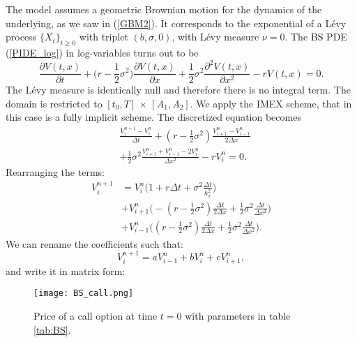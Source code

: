 The \cite{BS73} model assumes a geometric Brownian motion for the dynamics of the underlying, as we saw in (\ref{GBM2}).
It corresponds to the exponential of a Lévy process $\{X_t\}_{t\geq 0}$ with triplet $(b,\sigma,0)$, with Lévy measure $\nu = 0$.
The BS PDE (\ref{PIDE_log}) in log-variables turns out to be
\begin{equation}\label{BS_PDE}
\frac{\partial  V(t,x)}{\partial t}  
          + \biggl( r -\frac{1}{2}\sigma^2 \biggr) \frac{\partial V(t,x)}{\partial x}
          + \frac{1}{2} \sigma^2 \frac{\partial^2  V(t,x)}{\partial x^2} - r  V(t,x)  = 0.
\end{equation}
The Lévy measure is identically null and therefore there is no integral term.
The domain is restricted to $[t_0,T]\, \times \, [A_1,A_2]$. We apply the IMEX scheme, that in this case is a fully implicit scheme.  
The discretized equation becomes
\begin{align}
&\frac{V^{n+1}_{i} -V^{n}_{i}}{\Delta t} + 
(r-\frac{1}{2}\sigma^2) \frac{V^{n}_{i+1} -V^{n}_{i-1}}{ 2 \Delta x} \\ \nonumber
&+ \frac{1}{2} \sigma^2 \frac{V^{n}_{i+1} + V^{n}_{i-1} - 2 V^{n}_{i}}{\Delta x^2}  - r V^{n}_i = 0.
\end{align}
Rearranging the terms: 
\begin{align*}
 V^{n+1}_{i} &= V^{n}_{i} \biggl( 1 + r\Delta t + \sigma^2 \frac{\Delta t}{h_x^2} \biggr)  \\
& + V^{n}_{i+1} \biggl( -(r -\frac{1}{2}\sigma^2)\frac{\Delta t}{2 \Delta x} +
\frac{1}{2}\sigma^2 \frac{\Delta t}{\Delta x^2}  \biggr)  \\
& + V^{n}_{i-1} \biggl( (r -\frac{1}{2}\sigma^2)\frac{\Delta t}{2 \Delta x} + 
\frac{1}{2}\sigma^2 \frac{\Delta t}{\Delta x^2}  \biggr).
\end{align*}
We can rename the coefficients such that:
$$ V^{n+1}_{i} = a V^{n}_{i-1} + b V^{n}_{i} + c V^{n}_{i+1}, $$
and write it in matrix form:
\begin{figure}[t]
   \centering
   \texttt{[image: BS\_call.png]}
   \caption{Price of a call option at time $t=0$ with parameters in table \ref{tab:BS}.}
   \label{BS_call}
\end{figure}  
